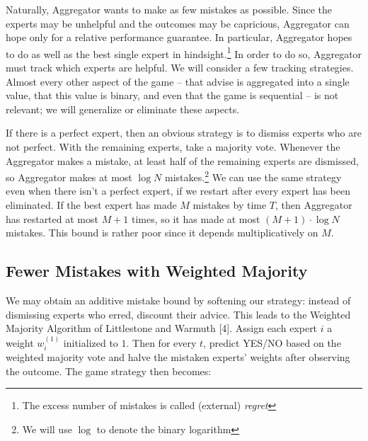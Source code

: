 Naturally, Aggregator wants to make as few mistakes as possible. Since the experts may be unhelpful
and the outcomes may be capricious, Aggregator can hope only for a relative performance guarantee.
In particular, Aggregator hopes to do as well as the best single expert in
hindsight.\footnote{The excess number of mistakes is called (external) \emph{regret}} In order to
do so, Aggregator must track which experts are helpful. We will consider a few tracking
strategies. Almost every other aspect of the game -- that advise is aggregated into a single value,
that this value is binary, and even that the game is sequential -- is not relevant; we will
generalize or eliminate these aspects.

If there is a perfect expert, then an obvious strategy is to dismiss experts who are not perfect.
With the remaining experts, take a majority vote. Whenever the Aggregator makes a mistake, at least
half of the remaining experts are dismissed, so Aggregator makes at most
$\log N$ mistakes.\footnote{We will use $\log$ to denote the binary logarithm} We can use the same
strategy even when there isn't a perfect expert, if we restart after every expert has been
eliminated. If the best expert has made $M$ mistakes by time $T$, then Aggregator has restarted at
most $M+1$ times, so it has made at most $(M+1)\cdot\log N$ mistakes. This bound is rather poor
since it depends multiplicatively on $M$.

\subsection{Fewer Mistakes with Weighted Majority}

We may obtain an additive mistake bound by softening our strategy: instead of dismissing experts
who erred, discount their advice. This leads to the Weighted Majority Algorithm of Littlestone and
Warmuth [4]. Assign each expert $i$ a weight $w_i^{(1)}$ initialized to $1$. Then for every $t$,
predict YES/NO based on the weighted majority vote and halve the mistaken experts' weights after
observing the outcome. The game strategy then becomes:

